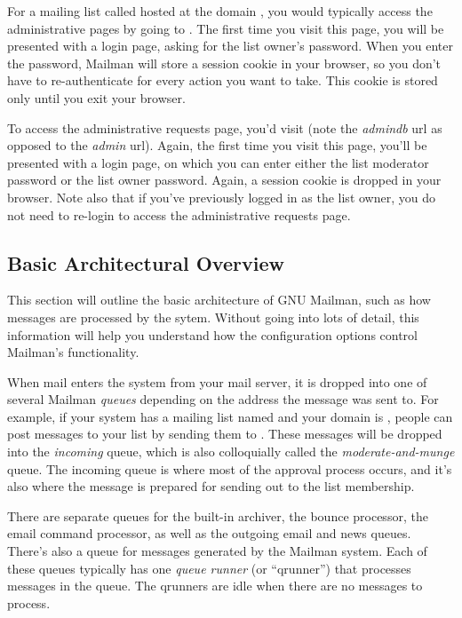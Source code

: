 \documentclass{howto}
\begin{document}
For a mailing list called  hosted at the domain
, you would typically access the administrative
pages by going to .
The first time you visit this page, you will be presented with a login
page, asking for the list owner's password.  When you enter the
password, Mailman will store a session cookie in your browser, so you
don't have to re-authenticate for every action you want to take.  This
cookie is stored only until you exit your browser.

To access the administrative requests page, you'd visit
 (note the
\emph{admindb} url as opposed to the \emph{admin} url).  Again, the
first time you visit this page, you'll be presented with a login page,
on which you can enter either the list moderator password or the list
owner password.  Again, a session cookie is dropped in your browser.
Note also that if you've previously logged in as the list owner, you
do not need to re-login to access the administrative requests page.

\subsection{Basic Architectural Overview}

This section will outline the basic architecture of GNU Mailman, such
as how messages are processed by the sytem.  Without going into lots
of detail, this information will help you understand how the
configuration options control Mailman's functionality.

When mail enters the system from your mail server, it is dropped into
one of several Mailman \emph{queues} depending on the address the
message was sent to.  For example, if your system has a mailing list
named  and your domain is , people can
post messages to your list by sending them to
.  These messages will be dropped into the
\emph{incoming} queue, which is also colloquially called the
\emph{moderate-and-munge} queue.  The incoming queue is where most of
the approval process occurs, and it's also where the message is
prepared for sending out to the list membership.

There are separate queues for the built-in archiver, the bounce
processor, the email command processor, as well as the outgoing email
and news queues.  There's also a queue for messages generated by the
Mailman system.  Each of these queues typically has one \emph{queue
runner} (or ``qrunner'') that processes messages in the queue.  The
qrunners are idle when there are no messages to process.
\end{document}
